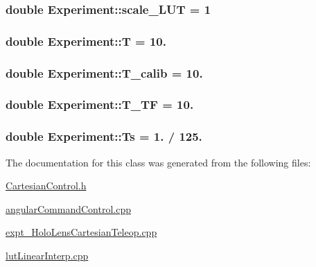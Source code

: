 \subsubsection[{\texorpdfstring{scale\+\_\+\+L\+UT}{scale_LUT}}]{\setlength{\rightskip}{0pt plus 5cm}double Experiment\+::scale\+\_\+\+L\+UT = 1}\hypertarget{classExperiment_ab599e3a9fd4a1529251af73c7a7d42c6}{}\label{classExperiment_ab599e3a9fd4a1529251af73c7a7d42c6}
\subsubsection[{\texorpdfstring{T}{T}}]{\setlength{\rightskip}{0pt plus 5cm}double Experiment\+::T = 10.}\hypertarget{classExperiment_add6f49b3c33cde40d8a6114c45d5475f}{}\label{classExperiment_add6f49b3c33cde40d8a6114c45d5475f}
\subsubsection[{\texorpdfstring{T\+\_\+calib}{T_calib}}]{\setlength{\rightskip}{0pt plus 5cm}double Experiment\+::\+T\+\_\+calib = 10.}\hypertarget{classExperiment_a0e11440fb68bc29a305c2757e5c85550}{}\label{classExperiment_a0e11440fb68bc29a305c2757e5c85550}
\subsubsection[{\texorpdfstring{T\+\_\+\+TF}{T_TF}}]{\setlength{\rightskip}{0pt plus 5cm}double Experiment\+::\+T\+\_\+\+TF = 10.}\hypertarget{classExperiment_ae4044c67ccebf1fd2370d304c2b6e6a6}{}\label{classExperiment_ae4044c67ccebf1fd2370d304c2b6e6a6}
\subsubsection[{\texorpdfstring{Ts}{Ts}}]{\setlength{\rightskip}{0pt plus 5cm}double Experiment\+::\+Ts = 1. / 125.}\hypertarget{classExperiment_ac51084a578b7edb7fa68f96d98671609}{}\label{classExperiment_ac51084a578b7edb7fa68f96d98671609}


The documentation for this class was generated from the following files\+:\begin{DoxyCompactItemize}
\item 
\hyperlink{CartesianControl_8h}{Cartesian\+Control.\+h}\item 
\hyperlink{angularCommandControl_8cpp}{angular\+Command\+Control.\+cpp}\item 
\hyperlink{expt__HoloLensCartesianTeleop_8cpp}{expt\+\_\+\+Holo\+Lens\+Cartesian\+Teleop.\+cpp}\item 
\hyperlink{lutLinearInterp_8cpp}{lut\+Linear\+Interp.\+cpp}\end{DoxyCompactItemize}
